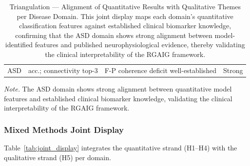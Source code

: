\begin{table}[H]
\centering
\caption[Triangulation of Quantitative and Qualitative Findings]{Triangulation --- Alignment of Quantitative Results with Qualitative Themes per Disease Domain. This joint display maps each domain's quantitative classification features against established clinical biomarker knowledge, confirming that the ASD domain shows strong alignment between model-identified features and published neurophysiological evidence, thereby validating the clinical interpretability of the RGAIG framework.}
\tablestripes\tablefontsize
\begin{tabularx}{\textwidth}{@{} >{\raggedright\arraybackslash}p{0.8cm} L L >{\raggedright\arraybackslash}p{1.2cm} @{}}
\toprule
{} &  &  &  \\
\midrule
ASD & \asdacc{} acc.; connectivity top-3 & F-P coherence deficit well-established & Strong \\
\bottomrule
\end{tabularx}

\vspace{0.5em}\noindent\textit{Note.} The ASD domain shows strong alignment between quantitative model features and established clinical biomarker knowledge, validating the clinical interpretability of the RGAIG framework.
\end{table}

\subsubsection{Mixed Methods Joint Display}

Table~\ref{tab:joint_display} integrates the quantitative strand (H1--H4) with the qualitative strand (H5) per domain.

